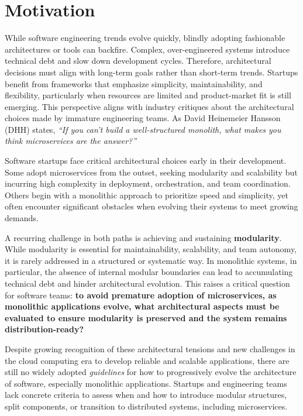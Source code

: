 \section{Motivation}

While software engineering trends evolve quickly, blindly adopting fashionable architectures or tools can backfire. Complex, over-engineered systems introduce technical debt and slow down development cycles. Therefore, architectural decisions must align with long-term goals rather than short-term trends. Startups benefit from frameworks that emphasize simplicity, maintainability, and flexibility, particularly when resources are limited and product-market fit is still emerging. This perspective aligns with industry critiques about the architectural choices made by immature engineering teams. As David Heinemeier Hansson (DHH) states, \textit{\enquote{If you can't build a well-structured monolith, what makes you think microservices are the answer?}} \cite{dhh2021}

Software startups face critical architectural choices early in their development. Some adopt microservices from the outset, seeking modularity and scalability but incurring high complexity in deployment, orchestration, and team coordination. Others begin with a monolithic approach to prioritize speed and simplicity, yet often encounter significant obstacles when evolving their systems to meet growing demands.

A recurring challenge in both paths is achieving and sustaining \textbf{modularity}. While modularity is essential for maintainability, scalability, and team autonomy, it is rarely addressed in a structured or systematic way. In monolithic systems, in particular, the absence of internal modular boundaries can lead to accumulating technical debt and hinder architectural evolution. This raises a critical question for software teams: \textbf{to avoid premature adoption of microservices, as monolithic applications evolve, what architectural aspects must be evaluated to ensure modularity is preserved and the system remains distribution-ready?}

Despite growing recognition of these architectural tensions and new challenges in the cloud computing era to develop reliable and scalable applications, there are still no widely adopted \textit{ guidelines} for how to progressively evolve the architecture of software, especially monolithic applications. Startups and engineering teams lack concrete criteria to assess when and how to introduce modular structures, split components, or transition to distributed systems, including microservices.


